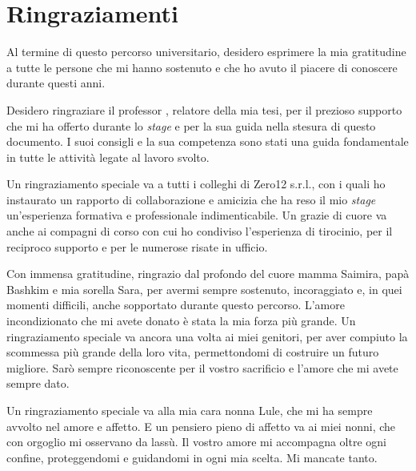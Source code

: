 \cleardoublepage
{}
{}



\begingroup
\let\clearpage\relax
\let\cleardoublepage\relax
\let\cleardoublepage\relax

\chapter*{Ringraziamenti}

Al termine di questo percorso universitario, desidero esprimere la mia gratitudine a tutte le persone che mi hanno sostenuto e che ho avuto il piacere di conoscere durante questi anni.

\vspace{10pt}

\noindent Desidero ringraziare il professor \myProf, relatore della mia tesi, per il prezioso supporto che mi ha offerto durante lo \textit{stage} e per la sua guida nella stesura di questo documento. I suoi consigli e la sua competenza sono stati una guida fondamentale in tutte le attività legate al lavoro svolto.

\vspace{10pt}

\noindent Un ringraziamento speciale va a tutti i colleghi di Zero12 s.r.l., con i quali ho instaurato un rapporto di collaborazione e amicizia che ha reso il mio \textit{stage} un'esperienza formativa e professionale indimenticabile. Un grazie di cuore va anche ai compagni di corso con cui ho condiviso l’esperienza di tirocinio, per il reciproco supporto e per le numerose risate in ufficio.

\vspace{10pt}

\noindent Con immensa gratitudine, ringrazio dal profondo del cuore mamma Saimira, papà Bashkim e mia sorella Sara, per avermi sempre sostenuto, incoraggiato e, in quei momenti difficili, anche sopportato durante questo percorso. L'amore incondizionato che mi avete donato è stata la mia forza più grande. Un ringraziamento speciale va ancora una volta ai miei genitori, per aver compiuto la scommessa più grande della loro vita, permettondomi di costruire un futuro migliore. Sarò sempre riconoscente per il vostro sacrificio e l'amore che mi avete sempre dato.

\vspace{10pt}
\noindent Un ringraziamento speciale va alla mia cara nonna Lule, che mi ha sempre avvolto nel amore e affetto. E un pensiero pieno di affetto va ai miei nonni, che con orgoglio mi osservano da lassù. Il vostro amore mi accompagna oltre ogni confine, proteggendomi e guidandomi in ogni mia scelta. Mi mancate tanto.

